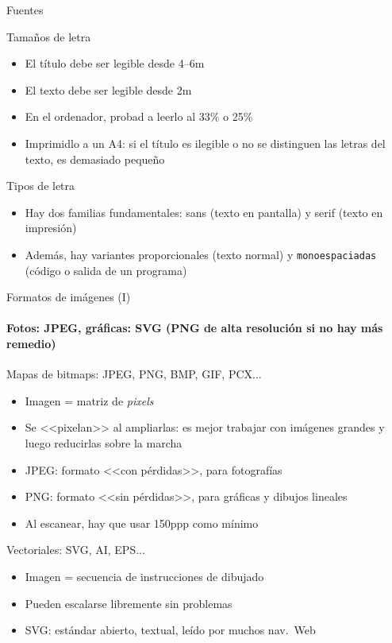 \documentclass[xcolor=svgnames,compress]{beamer}
\begin{document}
\begin{frame}{Fuentes}

  \begin{block}{Tamaños de letra}
    \begin{itemize}
    \item El título debe ser legible desde 4--6m
    \item El texto debe ser legible desde 2m
    \item En el ordenador, probad a leerlo al 33\% o 25\%
    \item Imprimidlo a un A4: si el título es ilegible o no se
      distinguen las letras del texto, es demasiado pequeño
    \end{itemize}
  \end{block}

  \begin{block}{Tipos de letra}
    \begin{itemize}
    \item Hay dos familias fundamentales: sans (texto en pantalla) y
      \textrm{serif} (texto en impresión)
    \item Además, hay variantes proporcionales (texto normal) y
      \texttt{monoespaciadas} (código o salida de un programa)
    \end{itemize}
  \end{block}

\end{frame}

\begin{frame}{Formatos de imágenes (I)}
  \framesubtitle{Fotos: JPEG, gráficas: SVG (PNG de alta resolución si no hay más remedio)}

  \begin{block}{Mapas de bitmaps: JPEG, PNG, BMP, GIF, PCX...}
    \begin{itemize}
    \item Imagen = matriz de \emph{pixels}
    \item Se <<pixelan>> al ampliarlas: es mejor trabajar con imágenes
      grandes y luego reducirlas sobre la marcha
    \item JPEG: formato <<con pérdidas>>, para fotografías
    \item PNG: formato <<sin pérdidas>>, para gráficas y dibujos
      lineales
    \item Al escanear, hay que usar 150ppp como mínimo
    \end{itemize}
  \end{block}

  \begin{block}{Vectoriales: SVG, AI, EPS...}
    \begin{itemize}
    \item Imagen = secuencia de instrucciones de dibujado
    \item Pueden escalarse libremente sin problemas
    \item SVG: estándar abierto, textual, leído por muchos nav.\ Web
    \end{itemize}
  \end{block}

\end{frame}
\end{document}

